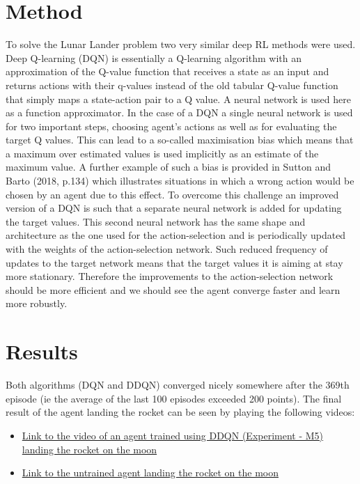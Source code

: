 \documentclass{article}
\begin{document}
\section{Method}
To solve the Lunar Lander problem two very similar deep RL methods were used. Deep Q-learning (DQN) is essentially a Q-learning algorithm with an approximation of the Q-value function that receives a state as an input and returns actions with their q-values instead of the old tabular Q-value function that simply maps a state-action pair to a Q value. A neural network is used here as a function approximator. In the case of a DQN a single neural network is used for two important steps, choosing agent's actions as well as for evaluating the target Q values. This can lead to a so-called maximisation bias which means that a maximum over estimated values is used implicitly as an estimate of the maximum value. A further example of such a bias is provided in Sutton and Barto (2018, p.134) which illustrates situations in which a wrong action would be chosen by an agent due to this effect. To overcome this challenge an improved version of a DQN is such that a separate neural network is added for updating the target values. This second neural network has the same shape and architecture as the one used for the action-selection and is periodically updated with the weights of the action-selection network. Such reduced frequency of updates to the target network means that the target values it is aiming at stay more stationary. Therefore the improvements to the action-selection network should be more efficient and we should see the agent converge faster and learn more robustly.

\section{Results}
Both algorithms (DQN and DDQN) converged nicely somewhere after the 369th episode (ie the average of the last 100 episodes exceeded 200 points). The final result of the agent landing the rocket can be seen by playing the following videos:

\begin{itemize}
  \item \href{https://youtu.be/csrk1gOcRPU}{Link to the video of an agent trained using DDQN (Experiment - M5) landing the rocket on the moon } 
  \item \href{https://youtu.be/Jb_1M_E6ofE}{Link to the untrained agent landing the rocket on the moon } 
\end{itemize}
\end{document}
